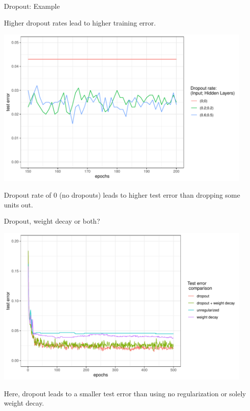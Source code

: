 \begin{vbframe}{Dropout: Example}
\begin{knitrout}
{}


\end{knitrout}
Higher dropout rates lead to higher training error. 
\framebreak

\begin{knitrout}\scriptsize
{}\color{fgcolor}

{\centering \includegraphics[width=0.95\textwidth]{figure/unnamed-chunk-4-1} 

}


\end{knitrout}
Dropout rate of 0 (no dropouts) leads to higher test error than dropping some units out. 
\end{vbframe}
\begin{vbframe}{Dropout, weight decay or both?}

\begin{knitrout}\scriptsize
{}\color{fgcolor}

{\centering \includegraphics[width=0.95\textwidth]{figure/unnamed-chunk-5-1} 

}


\end{knitrout}
Here, dropout leads to a smaller test error than using no regularization or solely weight decay. 
\end{vbframe}

